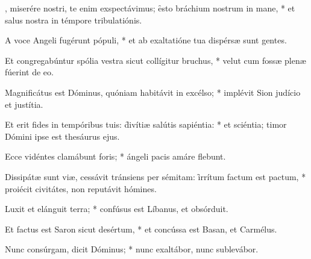 \begin{psalmus}

		, miserére nostri, te enim exspectávimus; \f esto bráchium nostrum in mane, * et salus nostra in témpore tribulatiónis.

		 A voce Angeli fugérunt pópuli, * et ab exaltatióne tua dispérsæ sunt gentes.

		 Et congregabúntur spólia vestra sicut collígitur bruchus, * velut cum fossæ plenæ fúerint de eo.

		 Magnificátus est Dóminus, quóniam habitávit in excélso; * implévit Sion judício et justítia.

		 Et erit fides in tempóribus tuis: \f divítiæ salútis sapiéntia: * et sciéntia; timor Dómini ipse est thesáurus ejus.

		 Ecce vidéntes clamábunt foris; * ángeli pacis amáre flebunt.

		 Dissipátæ sunt viæ, cessávit tránsiens per sémitam: \f irrítum factum est pactum, * proiécit civitátes, non reputávit hómines.

		 Luxit et elánguit terra; * confúsus est Líbanus, et obsórduit.

		 Et factus est Saron sicut desértum, * et concússa est Basan, et Carmélus.

		 Nunc consúrgam, dicit Dóminus; * nunc exaltábor, nunc sublevábor.

\end{psalmus}
